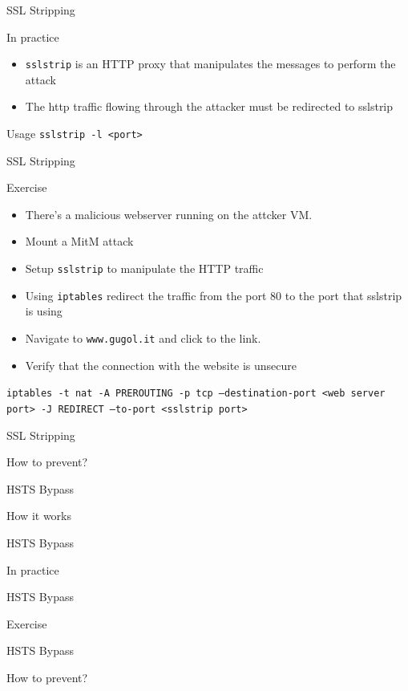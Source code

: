 \documentclass{beamer}
\begin{document}
\begin{frame}{SSL Stripping}
  \begin{block}{In practice}
    \begin{itemize}
      \item \texttt{sslstrip} is an HTTP proxy that manipulates the messages to perform the attack
      \item The http traffic flowing through the attacker must be redirected to sslstrip
    \end{itemize}
  \end{block}
  \begin{block}{Usage}
  \texttt{sslstrip -l <port>}
  \end{block}
\end{frame}
\begin{frame}{SSL Stripping}
  \begin{block}{Exercise}
    \begin{itemize}
      \item There's a malicious webserver running on the attcker VM.
      \item Mount a MitM attack
      \item Setup \texttt{sslstrip} to manipulate the HTTP traffic
      \item Using \texttt{iptables} redirect the traffic from the port 80 to the port that sslstrip is using
      \item Navigate to \texttt{www.gugol.it} and click to the link.
      \item Verify that the connection with the website is unsecure
    \end{itemize}
  \end{block}
  \pause
  \texttt{iptables -t nat -A PREROUTING -p tcp --destination-port <web server port> -J REDIRECT --to-port <sslstrip port>}

\end{frame}
\begin{frame}{SSL Stripping}
  \begin{block}{How to prevent?}
  \end{block}
\end{frame}


\begin{frame}{HSTS Bypass}
  \begin{block}{How it works}
  \end{block}
\end{frame}
\begin{frame}{HSTS Bypass}
  \begin{block}{In practice}
  \end{block}
\end{frame}
\begin{frame}{HSTS Bypass}

  \begin{block}{Exercise}
  \end{block}
\end{frame}
\begin{frame}{HSTS Bypass}

  \begin{block}{How to prevent?}
  \end{block}
\end{frame}
\end{document}
